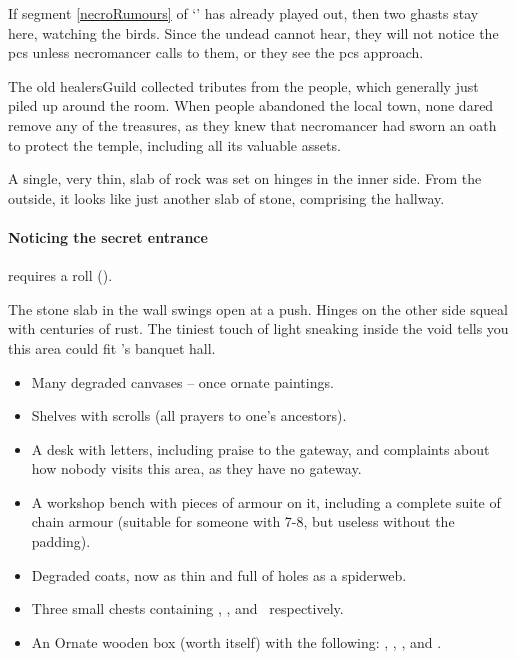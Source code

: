 \begin{multicols}{2}

If \gls{segment} \ref{necroRumours} of `' has already played out, then two ghasts stay here, watching the birds.
Since the undead cannot hear, they will not notice the \glspl{pc} unless \gls{necromancer} calls to them, or they see the \glspl{pc} approach.


\begin{exampletext}
  The old \gls{healersGuild} collected tributes from the people, which generally just piled up around the room.
  When people abandoned the local town, none dared remove any of the treasures, as they knew that \gls{necromancer} had sworn an oath to protect the temple, including all its valuable assets.
\end{exampletext}

\noindent
A single, very thin, slab of rock was set on hinges in the inner side.
From the outside, it looks like just another slab of stone, comprising the hallway.

\paragraph{Noticing the secret entrance}
requires a  roll (\tn[12]).

\begin{boxtext}
  The stone slab in the wall swings open at a push.
  Hinges on the other side squeal with centuries of rust.
  The tiniest touch of light sneaking inside the void tells you this area could fit 's banquet hall.
\end{boxtext}

\begin{itemize}
  \item
  Many degraded canvases -- once ornate paintings.
  \item
  Shelves with scrolls (all prayers to one's ancestors).
  \item
  A desk with letters, including praise to the gateway, and complaints about how nobody visits this area, as they have no gateway.
  \item
  A workshop bench with pieces of armour on it, including a complete suite of chain armour (suitable for someone with  7-8, but useless without the padding).
  \item
  Degraded coats, now as thin and full of holes as a spiderweb.
  \item
  Three small chests containing \lootMedium, \lootBig, and \lootBig\ respectively.
  \item
  An Ornate wooden box (worth  itself) with the following: \lootJewellery, \lootJewellery, \lootJewellery, and \lootJewellery.
\end{itemize}


\end{multicols}
